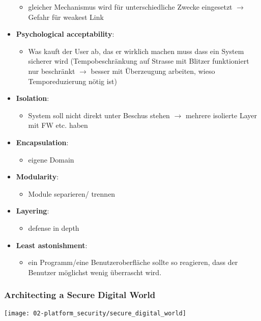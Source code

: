 \begin{itemize}
    \begin{itemize}
        \item gleicher Mechanismus wird für unterschiedliche Zwecke eingesetzt $\rightarrow$ Gefahr für weakest Link
    \end{itemize}
    \item \textbf{Psychological acceptability}: 
    \begin{itemize}
        \item Was kauft der User ab, das er wirklich machen muss dass ein System sicherer wird (Tempobeschränkung auf Strasse mit Blitzer funktioniert nur beschränkt $\rightarrow$ besser mit Überzeugung arbeiten, wieso Temporeduzierung nötig ist)
    \end{itemize}
    \item \textbf{Isolation}: 
    \begin{itemize}
        \item System soll nicht direkt unter Beschus stehen $\rightarrow$ mehrere isolierte Layer mit FW etc. haben
    \end{itemize}
    \item \textbf{Encapsulation}: 
    \begin{itemize}
        \item eigene Domain
    \end{itemize}
    \item \textbf{Modularity}: 
    \begin{itemize}
        \item Module separieren/ trennen
    \end{itemize}
    \item \textbf{Layering}: 
    \begin{itemize}
        \item defense in depth
    \end{itemize}
    \item \textbf{Least astonishment}: 
    \begin{itemize}
        \item ein Programm/eine Benutzeroberfläche sollte so reagieren, dass der Benutzer möglichst wenig überrascht wird.
    \end{itemize}
\end{itemize}

\subsubsection{Architecting a Secure Digital World}
\begin{center}
    \vspace{-8pt}
    \texttt{[image: 02-platform\_security/secure\_digital\_world]}
    \vspace{-8pt}
\end{center}

